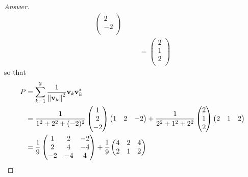 \documentclass[../psets.tex]{subfiles}
\begin{document}
\begin{enumerate}[label={\textbf{4.\arabic*.}}]
\begin{proof}[Answer]
\begin{align*}
\begin{pmatrix}
                    2\\
                    -2\\
                \end{pmatrix}\\
            &&
                &=
                \begin{pmatrix}
                    2\\
                    1\\
                    2\\
                \end{pmatrix}
        \end{align*}
        so that
        \begin{align*}
            P &= \sum_{k=1}^2\frac{1}{\norm{\mathbf{v}_k}^2}\mathbf{v}_k\mathbf{v}_k^*\\
            &= \frac{1}{1^2+2^2+(-2)^2}
            \begin{pmatrix}
                1\\
                2\\
                -2\\
            \end{pmatrix}
            \begin{pmatrix}
                1 & 2 & -2\\
            \end{pmatrix}
            +\frac{1}{2^2+1^2+2^2}
            \begin{pmatrix}
                2\\
                1\\
                2\\
            \end{pmatrix}
            \begin{pmatrix}
                2 & 1 & 2\\
            \end{pmatrix}\\
            &= \frac{1}{9}
            \begin{pmatrix}
                1 & 2 & -2\\
                2 & 4 & -4\\
                -2 & -4 & 4\\
            \end{pmatrix}
            +\frac{1}{9}
            \begin{pmatrix}
                4 & 2 & 4\\
                2 & 1 & 2\\

\end{pmatrix}
\end{align*}
\end{proof}
\end{enumerate}
\end{document}
